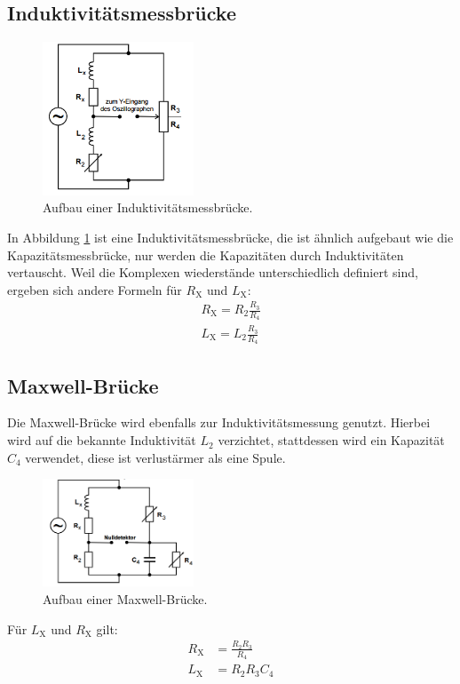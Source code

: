 \subsection{Induktivitätsmessbrücke}
\begin{figure}
 \centering
 \includegraphics[width=0.4\textwidth]{induktivitaet.PNG}
 \caption{Aufbau einer Induktivitätsmessbrücke.}
 \label{fig:induktivitaet}
 \end{figure}
 In Abbildung \ref{fig:induktivitaet} ist eine Induktivitätsmessbrücke, die ist ähnlich aufgebaut wie die Kapazitätsmessbrücke,
 nur werden die Kapazitäten durch Induktivitäten vertauscht.
 Weil die Komplexen wiederstände unterschiedlich definiert sind, ergeben sich andere Formeln für $R_\mathrm{X}$ und $L_\mathrm{X}$:
 \begin{align}
   R_\mathrm{X}=R_\mathrm{2}\frac{R_\mathrm{3}}{R_\mathrm{4}}\\
   L_\mathrm{X}=L_\mathrm{2}\frac{R_\mathrm{3}}{R_\mathrm{4}}
 \end{align}
\subsection{Maxwell-Brücke}
Die Maxwell-Brücke wird ebenfalls zur Induktivitätsmessung genutzt.
Hierbei wird auf die bekannte Induktivität $L_\mathrm{2}$ verzichtet, stattdessen wird ein Kapazität $C_\mathrm{4}$ verwendet, diese ist verlustärmer als eine Spule.
\begin{figure}
 \centering
 \includegraphics[width=0.4\textwidth]{maxwell.PNG}
 \caption{Aufbau einer Maxwell-Brücke.}
 \label{fig:maxwell}
 \end{figure}
Für $L_\mathrm{X}$ und $R_\mathrm{X}$ gilt:
\begin{align}
  R_\mathrm{X}&=\frac{R_\mathrm{2}R_\mathrm{3}}{R_\mathrm{4}}\\
  L_\mathrm{X}&=R_\mathrm{2}R_\mathrm{3}C_\mathrm{4}
\end{align}
